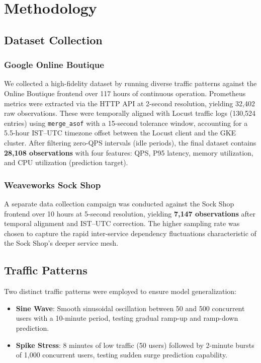 \documentclass[conference]{IEEEtran}
\begin{document}
\section{Methodology}\label{sec:methodology}

\subsection{Dataset Collection}

\subsubsection{Google Online Boutique}
We collected a high-fidelity dataset by running diverse traffic patterns against the Online Boutique frontend over 117 hours of continuous operation. Prometheus metrics were extracted via the HTTP API at 2-second resolution, yielding 32,402 raw observations. These were temporally aligned with Locust traffic logs (130,524 entries) using \texttt{merge\_asof} with a 15-second tolerance window, accounting for a 5.5-hour IST--UTC timezone offset between the Locust client and the GKE cluster. After filtering zero-QPS intervals (idle periods), the final dataset contains \textbf{28,108 observations} with four features: QPS, P95 latency, memory utilization, and CPU utilization (prediction target).

\subsubsection{Weaveworks Sock Shop}
A separate data collection campaign was conducted against the Sock Shop frontend over 10 hours at 5-second resolution, yielding \textbf{7,147 observations} after temporal alignment and IST--UTC correction. The higher sampling rate was chosen to capture the rapid inter-service dependency fluctuations characteristic of the Sock Shop's deeper service mesh.

\subsection{Traffic Patterns}
Two distinct traffic patterns were employed to ensure model generalization:

\begin{itemize}
    \item \textbf{Sine Wave}: Smooth sinusoidal oscillation between 50 and 500 concurrent users with a 10-minute period, testing gradual ramp-up and ramp-down prediction.
    \item \textbf{Spike Stress}: 8 minutes of low traffic (50 users) followed by 2-minute bursts of 1,000 concurrent users, testing sudden surge prediction capability.
\end{itemize}
\end{document}
